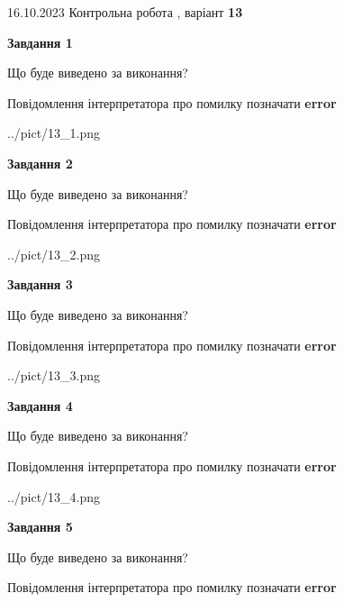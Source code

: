 \documentclass[12pt, ukrainian]{article}
\begin{document}
{\Large{16.10.2023 Контрольна робота , варіант  \No \textbf { 13 }\par}}
{
\begin {large}
{\begin {center}\textbf{Завдання 1}\end {center}}\par
Що буде виведено за виконання? \par
Повідомлення інтерпретатора про помилку позначати \textbf{error}

\begin{center}
	{../pict/13_1.png}
\end{center}
\newpage

{\begin {center}\textbf{Завдання 2}\end {center}}\par
Що буде виведено за виконання? \par
Повідомлення інтерпретатора про помилку позначати \textbf{error}

\begin{center}
	{../pict/13_2.png}
\end{center}
\newpage

{\begin {center}\textbf{Завдання 3}\end {center}}\par
Що буде виведено за виконання? \par
Повідомлення інтерпретатора про помилку позначати \textbf{error}

\begin{center}
	{../pict/13_3.png}
\end{center}
\newpage

{\begin {center}\textbf{Завдання 4}\end {center}}\par
Що буде виведено за виконання? \par
Повідомлення інтерпретатора про помилку позначати \textbf{error}

\begin{center}
	{../pict/13_4.png}
\end{center}
\newpage

{\begin {center}\textbf{Завдання 5}\end {center}}\par
Що буде виведено за виконання? \par
Повідомлення інтерпретатора про помилку позначати \textbf{error}


\end{large}}
\end{document}
